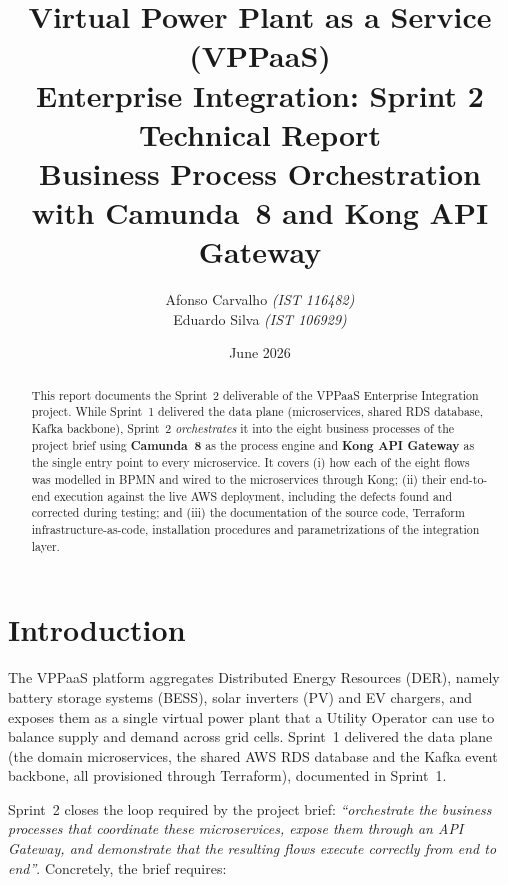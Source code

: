 \documentclass[11pt,a4paper]{article}
\title{ \textbf{Virtual Power Plant as a Service (VPPaaS)} \\[0.4em] \Large Enterprise Integration: Sprint 2 Technical Report \\[0.2em] \large Business Process Orchestration with Camunda~8 and Kong API Gateway
}
\author{ Afonso Carvalho \textit{(IST 116482)} \\ Eduardo Silva \textit{(IST 106929)}
}
\date{June 2026}
\begin{document}
 
\maketitle
 
\begin{abstract}
\noindent
This report documents the Sprint~2 deliverable of the VPPaaS Enterprise
Integration project. While Sprint~1 delivered the data plane (microservices,
shared RDS database, Kafka backbone), Sprint~2 \emph{orchestrates} it into the
eight business processes of the project brief using \textbf{Camunda~8} as the
process engine and \textbf{Kong API Gateway} as the single entry point to every
microservice. It covers (i) how each of the eight flows was modelled in BPMN
and wired to the microservices through Kong; (ii) their end-to-end execution
against the live AWS deployment, including the defects found and corrected
during testing; and (iii) the documentation of the source code, Terraform
infrastructure-as-code, installation procedures and parametrizations of the
integration layer.
\end{abstract}
 
\tableofcontents
\newpage
 
\section{Introduction}
 
The VPPaaS platform aggregates Distributed Energy Resources (DER), namely
battery storage systems (BESS), solar inverters (PV) and EV chargers, and
exposes them as a single virtual power plant that a Utility Operator can use
to balance supply and demand across grid cells. Sprint~1 delivered the data
plane (the domain microservices, the shared AWS RDS database and the Kafka
event backbone, all provisioned through Terraform), documented in Sprint~1.
 
Sprint~2 closes the loop required by the project brief: \emph{``orchestrate the
business processes that coordinate these microservices, expose them through an
API Gateway, and demonstrate that the resulting flows execute correctly from
end to end''}. Concretely, the brief requires:
 
\end{document}
